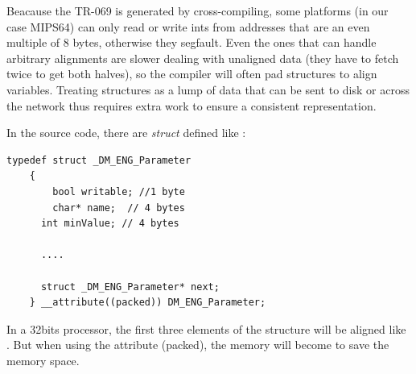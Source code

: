 Beacause the TR-069 is generated by cross-compiling, some platforms (in our case MIPS64) can only read or write ints from addresses that are an even multiple of 8 bytes, otherwise they segfault. Even the ones that can handle arbitrary alignments are slower dealing with unaligned data (they have to fetch twice to get both halves), so the compiler will often pad structures to align variables. Treating structures as a lump of data that can be sent to disk or across the network thus requires extra work to ensure a consistent representation.

In the source code, there are \textit{struct} defined like :
\begin{lstlisting}[mathescape]
    typedef struct _DM_ENG_Parameter
    {
    	bool writable; //1 byte
    	char* name;  // 4 bytes
      int minValue; // 4 bytes

      ....

      struct _DM_ENG_Parameter* next;
    } __attribute((packed)) DM_ENG_Parameter;
\end{lstlisting}


In a 32bits processor, the first three elements of the structure will be aligned like . But when using the attribute (packed), the memory will become  to save the memory space.

